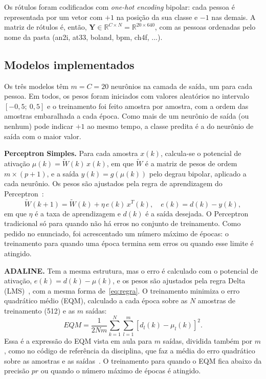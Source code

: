 \documentclass[conference]{IEEEtran}
\begin{document}
Os rótulos foram codificados com \textit{one-hot encoding} bipolar: cada
pessoa é representada por um vetor com $+1$ na posição da sua classe e $-1$
nas demais. A matriz de rótulos é, então,
$\mathbf{Y} \in \mathbb{R}^{C \times N} = \mathbb{R}^{20 \times 640}$, com as
pessoas ordenadas pelo nome da pasta (an2i, at33, boland, bpm, ch4f, ...).

\subsection{Modelos implementados}

Os três modelos têm $m = C = 20$ neurônios na camada de saída, um para
cada pessoa. Em todos, os pesos foram iniciados com valores aleatórios no
intervalo $[-0{,}5;\ 0{,}5]$ e o treinamento foi feito amostra por amostra,
com a ordem das amostras embaralhada a cada época. Como mais de um neurônio
de saída (ou nenhum) pode indicar $+1$ ao mesmo tempo, a classe predita é a
do neurônio de saída com o maior valor.

\textbf{Perceptron Simples.} Para cada amostra $x(k)$, calcula-se o
potencial de ativação $\mu(k) = \tilde{W}(k)\, x(k)$, em que $\tilde{W}$ é a
matriz de pesos de ordem $m \times (p+1)$, e a saída $y(k) = g(\mu(k))$ pelo
degrau bipolar, aplicado a cada neurônio. Os pesos são ajustados pela regra
de aprendizagem do Perceptron~\cite{b2}:
\begin{equation}
\tilde{W}(k+1) = \tilde{W}(k) + \eta\, e(k)\, x^T(k), \quad
e(k) = d(k) - y(k),
\label{eq:regra}
\end{equation}
em que $\eta$ é a taxa de aprendizagem e $d(k)$ é a saída desejada. O
Perceptron tradicional só para quando não há erros no conjunto de
treinamento. Como pedido no enunciado, foi acrescentado um número máximo
de épocas: o treinamento para quando uma época termina sem erros ou quando
esse limite é atingido.

\textbf{ADALINE.} Tem a mesma estrutura, mas o erro é calculado com o
potencial de ativação, $e(k) = d(k) - \mu(k)$, e os pesos são ajustados pela
regra Delta (LMS)~\cite{b3}, com a mesma forma de~\eqref{eq:regra}. O
treinamento minimiza o erro quadrático médio (EQM), calculado a cada época
sobre as $N$ amostras de treinamento (512) e as $m$ saídas:
\begin{equation}
EQM = \frac{1}{2Nm} \sum_{k=1}^{N} \sum_{l=1}^{m} \left[ d_l(k) - \mu_l(k) \right]^2.
\label{eq:eqm}
\end{equation}
Essa é a expressão do EQM vista em aula para $m$ saídas, dividida também
por $m$, como no código de referência da disciplina, que faz a média do
erro quadrático sobre as amostras e as saídas~\cite{b1}. O treinamento para
quando o EQM fica abaixo da precisão $pr$ ou quando o número máximo de
épocas é atingido.
\end{document}

